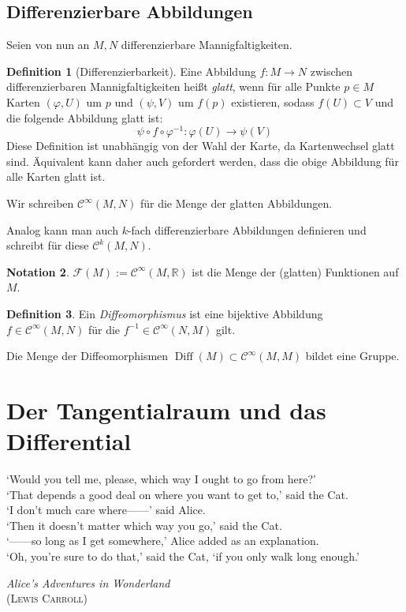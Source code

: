 \documentclass[a4paper]{scrreprt}
\numberwithin{equation}{chapter}
\DeclareMathOperator{\Diff}{Diff}
\newcommand{\R}{\mathbb{R}}
\newcommand{\sC}{\mathcal{C}^{\infty}}
\newcommand{\sm}{\mathcal{F}}
\theoremstyle{definition}
\newtheorem{defn}{Definition}[section]
\newtheorem{nota}[defn]{Notation}
\begin{document}
	\section{Differenzierbare Abbildungen}
		Seien von nun an $M,N$ differenzierbare Mannigfaltigkeiten.
		\begin{defn}[Differenzierbarkeit]
			Eine Abbildung $f\colon M\rightarrow N$ zwischen differenzierbaren Mannigfaltigkeiten heißt \emph{glatt}, wenn für alle Punkte $p\in M$ Karten $(\varphi,U)$ um  $p$ und $(\psi,V)$ um $f(p)$ existieren, sodass $f(U)\subset V$ und die folgende Abbildung glatt ist:
			\begin{equation}
				\psi\circ f \circ \varphi^{-1}\colon \varphi(U)\rightarrow \psi(V)
			\end{equation}
			Diese Definition ist unabhängig von der Wahl der Karte, da Kartenwechsel glatt sind. Äquivalent kann daher auch gefordert werden, dass die obige Abbildung für alle Karten glatt ist.

			Wir schreiben $\sC(M,N)$ für die Menge der glatten Abbildungen.
			
			Analog kann man auch $k$-fach differenzierbare Abbildungen definieren und schreibt für diese $\mathcal{C}^k(M,N)$.
		\end{defn}
		\begin{nota}
			$\sm(M):=\sC(M,\R)$ ist die Menge der (glatten) Funktionen auf $M$.
		\end{nota}
		\begin{defn}
			Ein \emph{Diffeomorphismus} ist eine bijektive Abbildung $f\in\sC(M,N)$ für die $f^{-1}\in\sC(N,M)$ gilt.

			Die Menge der Diffeomorphismen $\Diff(M)\subset\sC(M,M)$ bildet eine Gruppe.
		\end{defn}


\chapter{Der Tangentialraum und das Differential}
\epigraph{`Would you tell me, please, which way I ought to go from here?'\\
	`That depends a good deal on where you want to get to,' said the Cat.\\
	`I don't much care where------' said Alice.\\
	`Then it doesn't matter which way you go,' said the Cat.\\
	`------so long as I get somewhere,' Alice added as an explanation.\\
	`Oh, you're sure to do that,' said the Cat, `if you only walk long enough.'}
{\emph{Alice's Adventures in Wonderland}\\(\textsc{Lewis Carroll})}
\end{document}
